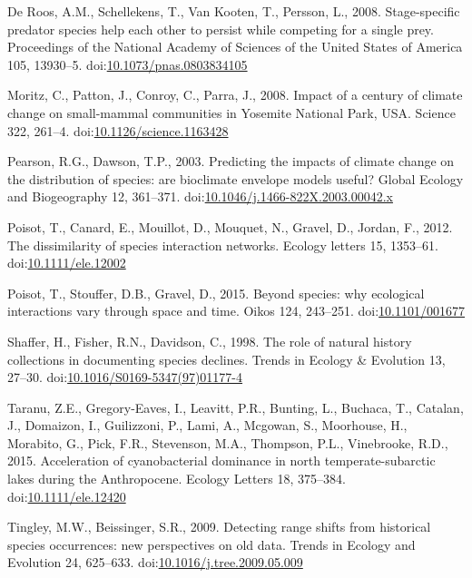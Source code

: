 \hypertarget{ref-DeRoos2008}{}
De Roos, A.M., Schellekens, T., Van Kooten, T., Persson, L., 2008.
Stage-specific predator species help each other to persist while
competing for a single prey. Proceedings of the National Academy of
Sciences of the United States of America 105, 13930--5.
doi:\href{https://doi.org/10.1073/pnas.0803834105}{10.1073/pnas.0803834105}

\hypertarget{ref-Moritz2008}{}
Moritz, C., Patton, J., Conroy, C., Parra, J., 2008. Impact of a century
of climate change on small-mammal communities in Yosemite National Park,
USA. Science 322, 261--4.
doi:\href{https://doi.org/10.1126/science.1163428}{10.1126/science.1163428}

\hypertarget{ref-Pearson2003}{}
Pearson, R.G., Dawson, T.P., 2003. Predicting the impacts of climate
change on the distribution of species: are bioclimate envelope models
useful? Global Ecology and Biogeography 12, 361--371.
doi:\href{https://doi.org/10.1046/j.1466-822X.2003.00042.x}{10.1046/j.1466-822X.2003.00042.x}

\hypertarget{ref-Poisot2012}{}
Poisot, T., Canard, E., Mouillot, D., Mouquet, N., Gravel, D., Jordan,
F., 2012. The dissimilarity of species interaction networks. Ecology
letters 15, 1353--61.
doi:\href{https://doi.org/10.1111/ele.12002}{10.1111/ele.12002}

\hypertarget{ref-Poisot2015}{}
Poisot, T., Stouffer, D.B., Gravel, D., 2015. Beyond species: why
ecological interactions vary through space and time. Oikos 124,
243--251. doi:\href{https://doi.org/10.1101/001677}{10.1101/001677}

\hypertarget{ref-Shaffer1998}{}
Shaffer, H., Fisher, R.N., Davidson, C., 1998. The role of natural
history collections in documenting species declines. Trends in Ecology
\& Evolution 13, 27--30.
doi:\href{https://doi.org/10.1016/S0169-5347(97)01177-4}{10.1016/S0169-5347(97)01177-4}

\hypertarget{ref-Taranu2015}{}
Taranu, Z.E., Gregory-Eaves, I., Leavitt, P.R., Bunting, L., Buchaca,
T., Catalan, J., Domaizon, I., Guilizzoni, P., Lami, A., Mcgowan, S.,
Moorhouse, H., Morabito, G., Pick, F.R., Stevenson, M.A., Thompson,
P.L., Vinebrooke, R.D., 2015. Acceleration of cyanobacterial dominance
in north temperate-subarctic lakes during the Anthropocene. Ecology
Letters 18, 375--384.
doi:\href{https://doi.org/10.1111/ele.12420}{10.1111/ele.12420}

\hypertarget{ref-Tingley2009b}{}
Tingley, M.W., Beissinger, S.R., 2009. Detecting range shifts from
historical species occurrences: new perspectives on old data. Trends in
Ecology and Evolution 24, 625--633.
doi:\href{https://doi.org/10.1016/j.tree.2009.05.009}{10.1016/j.tree.2009.05.009}
